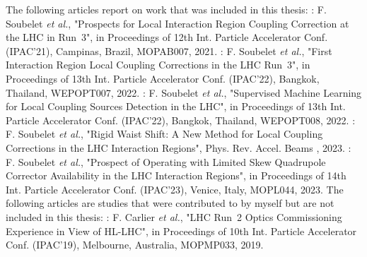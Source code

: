 \begin{declaration}
The following articles report on work that was included in this thesis:
\newline \newline
\noindent\cite{IPAC:Soubelet:Prospect_IR_Coupling_Correction_LHC_Run3}: F. Soubelet \textit{et al.}, "Prospects for Local Interaction Region Coupling Correction at the LHC in Run~\num{3}", in Proceedings of \num{12}th Int. Particle Accelerator Conf. (IPAC'21), Campinas, Brazil, MOPAB007, \num{2021}.
\newline \newline
\noindent\cite{IPAC:Soubelet:First_Corrections_IR_Local_Coupling_LHC_Run3}: F. Soubelet \textit{et al.}, "First Interaction Region Local Coupling Corrections in the LHC Run~\num{3}", in Proceedings of \num{13}th Int. Particle Accelerator Conf. (IPAC'22), Bangkok, Thailand, WEPOPT007, \num{2022}.
\newline \newline
\noindent\cite{IPAC:Soubelet:Supervised_Machine_Learning_Local_Coupling_Sources_Detection_LHC}: F. Soubelet \textit{et al.}, "Supervised Machine Learning for Local Coupling Sources Detection in the LHC", in Proceedings of \num{13}th Int. Particle Accelerator Conf. (IPAC'22), Bangkok, Thailand, WEPOPT008, \num{2022}.
\newline \newline
\noindent{}: F. Soubelet \textit{et al.}, "Rigid Waist Shift: A New Method for Local Coupling Corrections in the LHC Interaction Regions", Phys. Rev. Accel. Beams , \num{2023}.
\newline \newline
\noindent\cite{IPAC:Soubelet:Prospect_Operating_Limited_Skew_Quadrupole_Corrector_Availability_LHC_IR}: F. Soubelet \textit{et al.}, "Prospect of Operating with Limited Skew Quadrupole Corrector Availability in the LHC Interaction Regions", in Proceedings of \num{14}th Int. Particle Accelerator Conf. (IPAC'23), Venice, Italy, MOPL044, \num{2023}.
\newline
\newline
\indent
The following articles are studies that were contributed to by myself but are not included in this thesis:
\newline \newline
\noindent\cite{IPAC:Tomas:Run2_Experience_View_LHC_HLLHC}: F. Carlier \textit{et al.}, "LHC Run~\num{2} Optics Commissioning Experience in View of HL-LHC", in Proceedings of \num{10}th Int. Particle Accelerator Conf. (IPAC'19), Melbourne, Australia, MOPMP033, \num{2019}.

\end{declaration}
